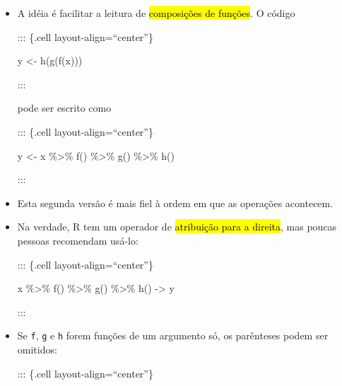 \documentclass[
  letterpaper,
  DIV=11,
  numbers=noendperiod]{scrreprt}
\newenvironment{Shaded}{\begin{snugshade}}{\end{snugshade}}
\newcommand{\FunctionTok}[1]{\textcolor[rgb]{0.28,0.35,0.67}{#1}}
\newcommand{\NormalTok}[1]{\textcolor[rgb]{0.00,0.23,0.31}{#1}}
\newcommand{\OtherTok}[1]{\textcolor[rgb]{0.00,0.23,0.31}{#1}}
\newcommand{\SpecialCharTok}[1]{\textcolor[rgb]{0.37,0.37,0.37}{#1}}
\begin{document}
\begin{itemize}
\item
  A idéia é facilitar a leitura de {\hl{composições de funções}}. O
  código

  ::: \{.cell layout-align=``center''\}

\begin{Shaded}
\begin{Highlighting}[]
\NormalTok{y }\OtherTok{\textless{}{-}} \FunctionTok{h}\NormalTok{(}\FunctionTok{g}\NormalTok{(}\FunctionTok{f}\NormalTok{(x)))}
\end{Highlighting}
\end{Shaded}

  :::

  pode ser escrito como

  ::: \{.cell layout-align=``center''\}

\begin{Shaded}
\begin{Highlighting}[]
\NormalTok{y }\OtherTok{\textless{}{-}}\NormalTok{ x }\SpecialCharTok{\%\textgreater{}\%} \FunctionTok{f}\NormalTok{() }\SpecialCharTok{\%\textgreater{}\%} \FunctionTok{g}\NormalTok{() }\SpecialCharTok{\%\textgreater{}\%} \FunctionTok{h}\NormalTok{()}
\end{Highlighting}
\end{Shaded}

  :::
\item
  Esta segunda versão é mais fiel à ordem em que as operações acontecem.
\item
  Na verdade, R tem um operador de {\hl{atribuição para a direita}}, mas
  poucas pessoas recomendam usá-lo:

  ::: \{.cell layout-align=``center''\}

\begin{Shaded}
\begin{Highlighting}[]
\NormalTok{x }\SpecialCharTok{\%\textgreater{}\%} \FunctionTok{f}\NormalTok{() }\SpecialCharTok{\%\textgreater{}\%} \FunctionTok{g}\NormalTok{() }\SpecialCharTok{\%\textgreater{}\%} \FunctionTok{h}\NormalTok{() }\OtherTok{{-}\textgreater{}}\NormalTok{ y}
\end{Highlighting}
\end{Shaded}

  :::
\item
  Se \texttt{f}, \texttt{g} e \texttt{h} forem funções de um argumento
  só, os parênteses podem ser omitidos:

  ::: \{.cell layout-align=``center''\}


\end{itemize}
\end{document}
